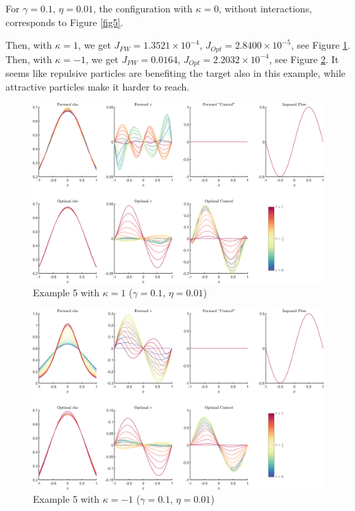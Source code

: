 \documentclass[11pt, a4paper]{article}
\theoremstyle{definition}
\begin{document}
For $\gamma = 0.1$, $\eta = 0.01$, the configuration with $\kappa = 0$, without interactions, corresponds to Figure \ref{fig5}.

Then, with $\kappa = 1$, we get $J_{FW} = 1.3521 \times 10^{-4}$, $J_{Opt} = 2.8400\times 10^{-5}$, see Figure \ref{fig5I1a}.
Then, with $\kappa = -1$, we get $J_{FW} = 0.0164$, $J_{Opt} = 2.2032 \times 10^{-4}$, see Figure \ref{fig5In1a}.
It seems like repulsive particles are benefiting the target also in this example, while attractive particles make it harder to reach.

\begin{figure}
	\includegraphics[scale=0.05]{ExampleI15.png}
	\caption{Example 5 with $\kappa = 1$ ($\gamma = 0.1$, $\eta = 0.01$)}
	\label{fig5I1a}
\end{figure} 
\begin{figure}
	\includegraphics[scale=0.05]{ExampleIn15.png}
	\caption{Example 5 with $\kappa = -1$ ($\gamma = 0.1$, $\eta = 0.01$)}
	\label{fig5In1a}
\end{figure} 
\end{document}
